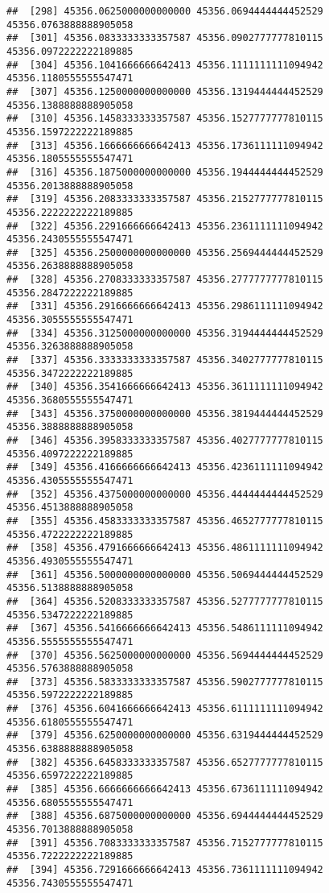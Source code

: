 \documentclass[
]{article}
\begin{document}
\begin{verbatim}
##  [298] 45356.0625000000000000 45356.0694444444452529 45356.0763888888905058
##  [301] 45356.0833333333357587 45356.0902777777810115 45356.0972222222189885
##  [304] 45356.1041666666642413 45356.1111111111094942 45356.1180555555547471
##  [307] 45356.1250000000000000 45356.1319444444452529 45356.1388888888905058
##  [310] 45356.1458333333357587 45356.1527777777810115 45356.1597222222189885
##  [313] 45356.1666666666642413 45356.1736111111094942 45356.1805555555547471
##  [316] 45356.1875000000000000 45356.1944444444452529 45356.2013888888905058
##  [319] 45356.2083333333357587 45356.2152777777810115 45356.2222222222189885
##  [322] 45356.2291666666642413 45356.2361111111094942 45356.2430555555547471
##  [325] 45356.2500000000000000 45356.2569444444452529 45356.2638888888905058
##  [328] 45356.2708333333357587 45356.2777777777810115 45356.2847222222189885
##  [331] 45356.2916666666642413 45356.2986111111094942 45356.3055555555547471
##  [334] 45356.3125000000000000 45356.3194444444452529 45356.3263888888905058
##  [337] 45356.3333333333357587 45356.3402777777810115 45356.3472222222189885
##  [340] 45356.3541666666642413 45356.3611111111094942 45356.3680555555547471
##  [343] 45356.3750000000000000 45356.3819444444452529 45356.3888888888905058
##  [346] 45356.3958333333357587 45356.4027777777810115 45356.4097222222189885
##  [349] 45356.4166666666642413 45356.4236111111094942 45356.4305555555547471
##  [352] 45356.4375000000000000 45356.4444444444452529 45356.4513888888905058
##  [355] 45356.4583333333357587 45356.4652777777810115 45356.4722222222189885
##  [358] 45356.4791666666642413 45356.4861111111094942 45356.4930555555547471
##  [361] 45356.5000000000000000 45356.5069444444452529 45356.5138888888905058
##  [364] 45356.5208333333357587 45356.5277777777810115 45356.5347222222189885
##  [367] 45356.5416666666642413 45356.5486111111094942 45356.5555555555547471
##  [370] 45356.5625000000000000 45356.5694444444452529 45356.5763888888905058
##  [373] 45356.5833333333357587 45356.5902777777810115 45356.5972222222189885
##  [376] 45356.6041666666642413 45356.6111111111094942 45356.6180555555547471
##  [379] 45356.6250000000000000 45356.6319444444452529 45356.6388888888905058
##  [382] 45356.6458333333357587 45356.6527777777810115 45356.6597222222189885
##  [385] 45356.6666666666642413 45356.6736111111094942 45356.6805555555547471
##  [388] 45356.6875000000000000 45356.6944444444452529 45356.7013888888905058
##  [391] 45356.7083333333357587 45356.7152777777810115 45356.7222222222189885
##  [394] 45356.7291666666642413 45356.7361111111094942 45356.7430555555547471

\end{verbatim}
\end{document}
